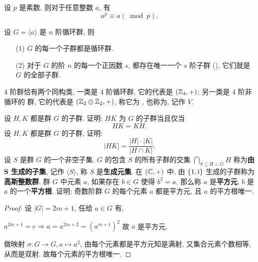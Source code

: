 \begin{theorem}[费马小定理]
	\noindent 设 $p$ 是素数, 则对于任意整数 $a$, 有 $$a^p\equiv a(\bmod p).$$
\end{theorem}

\begin{theorem}
	\noindent 设 $G=\langle a\rangle$ 是 $n$ 阶循环群, 则
	\begin{itemize}
		\item[(1)] $G$ 的每一个子群都是循环群.
		\item[(2)] 对于 $G$ 的阶 $n$ 的每一个正因数 $s$, 都存在唯一一个 $s$ 阶子群 (), 它们就是 $G$ 的全部子群.
	\end{itemize}
\end{theorem}

$4$ 阶群恰有两个同构类, 一类是 $4$ 阶循环群, 它的代表是 $(\mathbb Z_4,+)$; 另一类是 $4$ 阶非循环的 \Abel 群, 它的代表是 $(\mathbb Z_2\oplus\mathbb Z_2,+)$, 称它为 , 也称为, 记作 $V$.

\begin{practice}\label{prac:子群}
	\problem\label{prac:子群1}  设 $H,K$ 都是群 $G$ 的子群. 证明: $HK$ 为 $G$ 的子群当且仅当 $$HK=KH.$$
	\problem  设 $H,K$ 都是群 $G$ 的子群, 证明: $$|HK|=\frac{|H|\cdot|K|}{|H\cap K|}.$$
	\problem 设 $S$ 是群 $G$ 的一个非空子集. $G$ 的包含 $S$ 的所有子群的交集 $\bigcap\limits_{S\subseteq H<G} H$ 称为\textbf{由 S 生成的子集}, 记作 $\langle S\rangle$, 称 $S$ 是\textbf{生成元集}.
	\problem 在 $(\mathbb C,+)$ 中, 由 $\{1,\text {i}\}$ 生成的子群称为\textbf{高斯整数群}.
	\problem 群 $G$ 中元素 $a$, 如果存在 $b\in G$ 使得 $b^2=a$, 那么称 $a$ 是\textbf{平方元}, $b$ 是 $a$ 的一个\textbf{平方根}. 证明: 奇数阶群 $G$ 的每个元素 $a$ 都是平方元, 且 $a$ 的平方根唯一.
	\begin{proof}
		设 $|G|=2m+1$, 任给 $a\in G$ 有,

		$a^{2m+1}=e\Rightarrow a=a^{2m+2}=(a^{m+1})^2$ 故 $a$ 是平方元.

		做映射 $\sigma:G\to G,a\mapsto a^2$, 由每个元素都是平方元知是满射, 又集合元素个数相等, 从而是双射. 故每个元素的平方根唯一.
	\end{proof}
\end{practice}